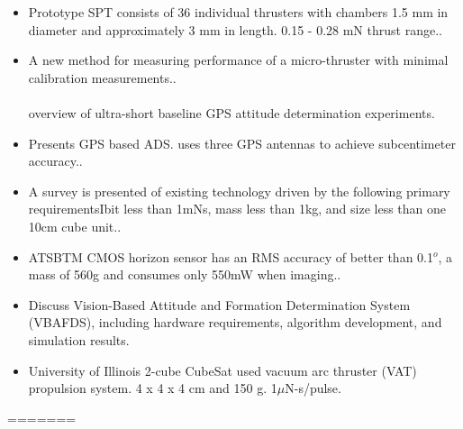 \begin{itemize}
\item Prototype SPT consists of 36 individual thrusters with chambers 1.5 mm in diameter and approximately 3 mm in length. 0.15 - 0.28 mN thrust range.\cite{Ref:Sathiyanathan10}. 
\item A new method for measuring performance of a micro-thruster with minimal calibration measurements.\cite{Ref:Chang08}. \\\\
overview of ultra-short baseline GPS attitude determination experiments\cite{Ref:Bageshwar06}. 
\item Presents GPS based ADS. uses three GPS antennas to achieve subcentimeter accuracy.\cite{Ref:Gershman06}. 

\item A survey is presented of existing technology driven by the following primary requirementsIbit less than 1mNs, mass less than 1kg, and size less than one 10cm cube unit.\cite{Ref:Storck06}. 

\item ATSBTM CMOS horizon sensor has an RMS accuracy of better than 0.1$^o$, a mass of 560g and consumes only 550mW when imaging.\cite{Ref:Bahar06}. 

\item Discuss Vision-Based Attitude and Formation Determination System (VBAFDS), including hardware requirements, algorithm development, and simulation results\cite{Ref:Rogers04}. 

\item University of Illinois 2-cube CubeSat used vacuum arc thruster (VAT) propulsion system.  4 x 4 x 4 cm and 150 g.  1$\mu$N-s/pulse\cite{Ref:Rysanek02}. 
\end{itemize}




%
%

%
=======
%
%
%
%
%

